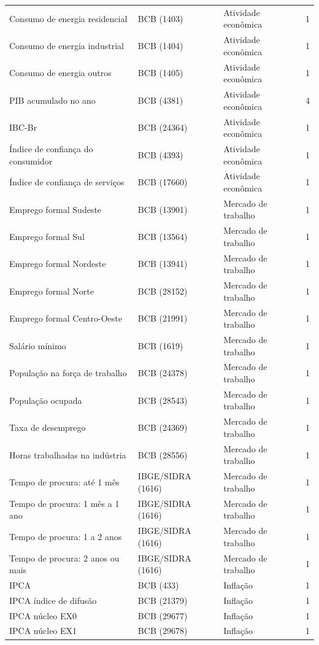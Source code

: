 \documentclass[
article,			%
12pt,				%
oneside,			%
a4paper,			%
hidelinks, 
english,			%
brazil,				%
]{abntex2}
\theoremstyle{plain}
\theoremstyle{definition}
\theoremstyle{remark}
\begin{document}
\begin{anexosenv}
\begin{ThreePartTable}
\begin{longtable}{@{}p{5.2cm} l l c@{}}
Consumo de energia residencial & BCB (1403) & Atividade econômica & 1 \\
Consumo de energia industrial & BCB (1404) & Atividade econômica & 1 \\
Consumo de energia outros & BCB (1405) & Atividade econômica & 1 \\
PIB acumulado no ano & BCB (4381) & Atividade econômica & 4 \\
IBC-Br & BCB (24364) & Atividade econômica & 1 \\
Índice de confiança do consumidor & BCB (4393) & Atividade econômica & 1 \\
Índice de confiança de serviços & BCB (17660) & Atividade econômica & 1 \\
Emprego formal Sudeste & BCB (13901) & Mercado de trabalho & 1 \\
Emprego formal Sul & BCB (13564) & Mercado de trabalho & 1 \\
Emprego formal Nordeste & BCB (13941) & Mercado de trabalho & 1 \\
Emprego formal Norte & BCB (28152) & Mercado de trabalho & 1 \\
Emprego formal Centro-Oeste & BCB (21991) & Mercado de trabalho & 1 \\
Salário mínimo & BCB (1619) & Mercado de trabalho & 1 \\
População na força de trabalho & BCB (24378) & Mercado de trabalho & 1 \\
População ocupada & BCB (28543) & Mercado de trabalho & 1 \\
Taxa de desemprego & BCB (24369) & Mercado de trabalho & 1 \\
Horas trabalhadas na indústria & BCB (28556) & Mercado de trabalho & 1 \\
Tempo de procura: até 1 mês & IBGE/SIDRA (1616) & Mercado de trabalho & 1 \\
Tempo de procura: 1 mês a 1 ano & IBGE/SIDRA (1616) & Mercado de trabalho & 1 \\
Tempo de procura: 1 a 2 anos & IBGE/SIDRA (1616) & Mercado de trabalho & 1 \\
Tempo de procura: 2 anos ou mais & IBGE/SIDRA (1616) & Mercado de trabalho & 1 \\
IPCA & BCB (433) & Inflação & 1 \\
IPCA índice de difusão & BCB (21379) & Inflação & 1 \\
IPCA núcleo EX0 & BCB (29677) & Inflação & 1 \\
IPCA núcleo EX1 & BCB (29678) & Inflação & 1 \\

\end{longtable}
\end{ThreePartTable}
\end{anexosenv}
\end{document}
